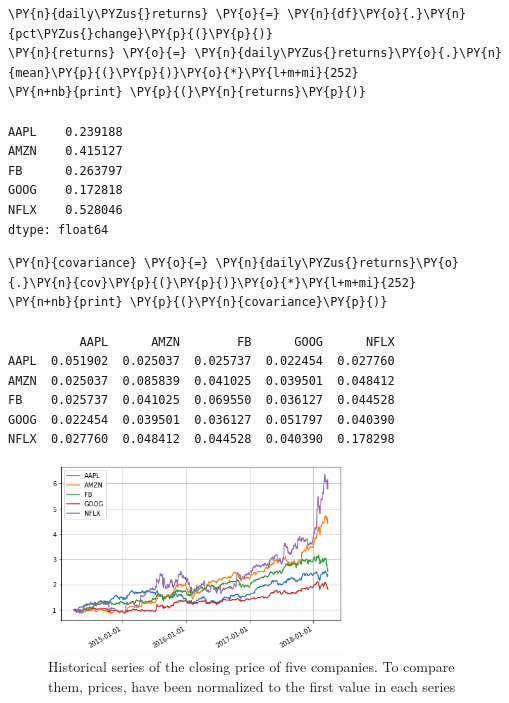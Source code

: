\begin{tcolorbox}[breakable, size=fbox, boxrule=1pt, pad at break*=1mm,colback=cellbackground, colframe=cellborder]
\begin{Verbatim}[commandchars=\\\{\}]
\PY{n}{daily\PYZus{}returns} \PY{o}{=} \PY{n}{df}\PY{o}{.}\PY{n}{pct\PYZus{}change}\PY{p}{(}\PY{p}{)}
\PY{n}{returns} \PY{o}{=} \PY{n}{daily\PYZus{}returns}\PY{o}{.}\PY{n}{mean}\PY{p}{(}\PY{p}{)}\PY{o}{*}\PY{l+m+mi}{252}
\PY{n+nb}{print} \PY{p}{(}\PY{n}{returns}\PY{p}{)}

AAPL    0.239188
AMZN    0.415127
FB      0.263797
GOOG    0.172818
NFLX    0.528046
dtype: float64
\end{Verbatim}
\end{tcolorbox}

\begin{tcolorbox}[breakable, size=fbox, boxrule=1pt, pad at break*=1mm,colback=cellbackground, colframe=cellborder]
\begin{Verbatim}[commandchars=\\\{\}]
\PY{n}{covariance} \PY{o}{=} \PY{n}{daily\PYZus{}returns}\PY{o}{.}\PY{n}{cov}\PY{p}{(}\PY{p}{)}\PY{o}{*}\PY{l+m+mi}{252}
\PY{n+nb}{print} \PY{p}{(}\PY{n}{covariance}\PY{p}{)}

          AAPL      AMZN        FB      GOOG      NFLX
AAPL  0.051902  0.025037  0.025737  0.022454  0.027760
AMZN  0.025037  0.085839  0.041025  0.039501  0.048412
FB    0.025737  0.041025  0.069550  0.036127  0.044528
GOOG  0.022454  0.039501  0.036127  0.051797  0.040390
NFLX  0.027760  0.048412  0.044528  0.040390  0.178298
\end{Verbatim}
\end{tcolorbox}

\begin{figure}[htb]
\centering
\includegraphics[width=0.7\textwidth]{figures/portfolio_sample}
\caption{Historical series of the closing price of five companies. To compare them, prices, have been normalized to the 
first value in each series}
\label{fig:stocks}
\end{figure}
    
